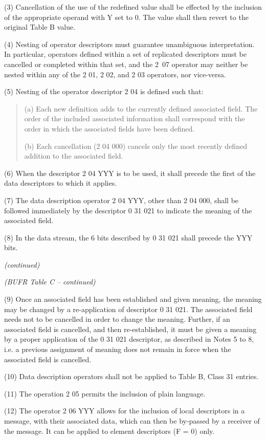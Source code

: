 (3) Cancellation of the use of the redefined value shall be effected by the inclusion of the appropriate operand with Y set to 0. The value shall then revert to the original Table B value.

(4) Nesting of operator descriptors must guarantee unambiguous interpretation. In particular, operators defined within a set of replicated descriptors must be cancelled or completed within that set, and the 2~07 operator may neither be nested within any of the 2 01, 2 02, and 2 03 operators, nor vice-versa.

(5) Nesting of the operator descriptor 2 04 is defined such that:

\begin{quote}
(a) Each new definition adds to the currently defined associated field. The order of the included associated information shall correspond with the order in which the associated fields have been defined.

(b) Each cancellation (2 04 000) cancels only the most recently defined addition to the associated field.
\end{quote}

(6) When the descriptor 2 04 YYY is to be used, it shall precede the first of the data descriptors to which it applies.

(7) The data description operator 2 04 YYY, other than 2 04 000, shall be followed immediately by the descriptor 0 31 021 to indicate the meaning of the associated field.

(8) In the data stream, the 6 bits described by 0 31 021 shall precede the YYY bits.

\emph{(continued)}

\emph{(BUFR Table C -- continued)}

(9) Once an associated field has been established and given meaning, the meaning may be changed by a re-application of descriptor 0 31 021. The associated field needs not to be cancelled in order to change the meaning. Further, if an associated field is cancelled, and then re-established, it must be given a meaning by a proper application of the 0 31 021 descriptor, as described in Notes 5 to 8, i.e. a previous assignment of meaning does not remain in force when the associated field is cancelled.

(10) Data description operators shall not be applied to Table B, Class 31 entries.

(11) The operation 2 05 permits the inclusion of plain language.

(12) The operator 2 06 YYY allows for the inclusion of local descriptors in a message, with their associated data, which can then be by-passed by a receiver of the message. It can be applied to element descriptors (F = 0) only.

